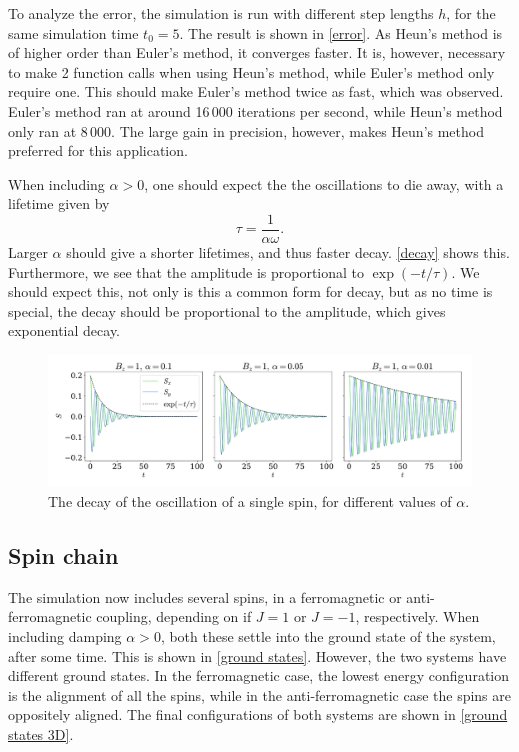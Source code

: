 \documentclass{article}
\begin{document}
    To analyze the error, the simulation is run with different step lengths $h$, for the same simulation time $t_0 = 5$.
    The result is shown in \autoref{error}.
    As Heun's method is of higher order than Euler's method, it converges faster.
    It is, however, necessary to make 2 function calls when using Heun's method, while Euler's method only require one.
    This should make Euler's method twice as fast, which was observed.
    Euler's method ran at around 16\,000 iterations per second, while Heun's method only ran at 8\,000.
    The large gain in precision, however, makes Heun's method preferred for this application.

    When including $\alpha > 0$, one should expect the the oscillations to die away, with a lifetime given by
    \begin{equation*}
        \tau = \frac{1}{\alpha \omega}.
    \end{equation*}
    Larger $\alpha$ should give a shorter lifetimes, and thus faster decay.
    \autoref{decay} shows this.
    Furthermore, we see that the amplitude is proportional to $\exp(-t/\tau)$.
    We should expect this, not only is this a common form for decay, but as no time is special, the decay should be proportional to the amplitude, which gives exponential decay.

    \begin{figure}[H]
        \centering
        \includegraphics[width=\textwidth]{../plots/decay_a.pdf}
        \caption{The decay of the oscillation of a single spin, for different values of $\alpha$.}
        \label{decay}
    \end{figure}

    \subsection*{Spin chain}
    The simulation now includes several spins, in a ferromagnetic or anti-ferromagnetic coupling, depending on if $J = 1$ or $J = -1$, respectively.
    When including damping $\alpha > 0$, both these settle into the ground state of the system, after some time.
    This is shown in \autoref{ground states}.
    However, the two systems have different ground states.
    In the ferromagnetic case, the lowest energy configuration is the alignment of all the spins, while in the anti-ferromagnetic case the spins are oppositely aligned.
    The final configurations of both systems are shown in \autoref{ground states 3D}.
\end{document}
